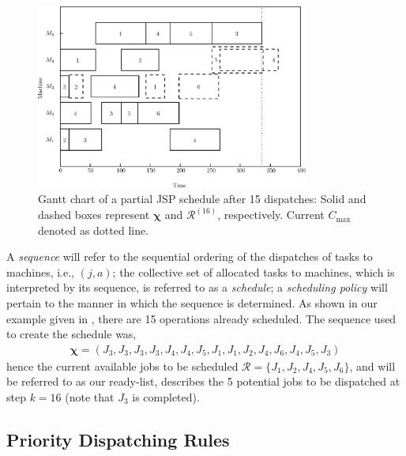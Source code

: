 \documentclass[smallextended]{svjour3}
\renewcommand{\vchi}{\bm \chi}
\begin{document}
	\begin{figure}[t!]\centering 
		\includegraphics[width=0.8\textwidth]{figures/jssp_example_nocolor.eps}
		\caption[Gantt chart of a partial JSP schedule]{Gantt chart of a partial JSP schedule after 15 dispatches: Solid and dashed boxes represent $\vchi$ and $\mathcal{R}^{(16)}$, respectively. Current $C_{\max}$ denoted as dotted line.}
		\label{fig:jssp:example}
	\end{figure}
	
	
	A \emph{sequence} will refer to the sequential ordering of the dispatches of tasks to machines, i.e., $(j,a)$; the collective set of allocated tasks to machines, which is interpreted by its sequence, is referred to as a \emph{schedule}; a \emph{scheduling policy} will pertain to the manner in which the sequence is determined.
	As shown in our example given in , there are 15 operations already scheduled. The sequence used to create the schedule was,
	\begin{eqnarray}
	\vchi=\left(J_3,J_3,J_3,J_3,J_4,J_4,J_5,J_1,J_1,J_2,J_4,J_6,J_4,J_5,J_3\right)
	\end{eqnarray}
	hence the current available jobs to be scheduled $\mathcal{R}=\{J_1,J_2,J_4,J_5,J_6\}$, and will be referred to as our ready-list, describes the 5 potential jobs to be dispatched at step $k=16$ (note that $J_3$ is completed).
	
	
	\subsection{Priority Dispatching Rules}
	
	
\end{document}
